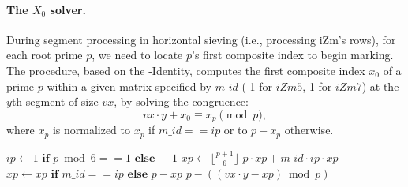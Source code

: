 \documentclass{article}
\begin{document}
\paragraph{The $X_0$ solver.}
During segment processing in horizontal sieving (i.e., processing iZm's rows), for each root prime $p$, we need to locate $p$'s first composite index to begin marking.
The  procedure, based on the \Xp-Identity, computes the first composite index $x_0$ of a prime $p$ within a given matrix specified by $m\_id$ (-1 for $iZm5$, 1 for $iZm7$) at the $y$th segment of size $vx$, by solving the congruence:
\[
vx\cdot y + x_0 \equiv x_p \pmod p,
\]
where $x_p$ is normalized to $x_p$ if $m\_id == ip$ or to $p - x_p$ otherwise.

\begin{algorithmic}[1]
        \State $ip \gets 1 \textbf{ if } p \bmod 6 == 1 \textbf{ else } -1$
        \State $xp \gets \lfloor\frac{p + 1}{6}\rfloor$
            \State \Return $p \cdot xp + m\_id \cdot ip \cdot xp$  
        \EndIf
        \State $xp \gets xp \textbf{ if } m\_id == ip \textbf{ else } p - xp$ 
        \State \Return $p - ((vx \cdot y - xp) \bmod p)$ 
    \EndProcedure
\end{algorithmic}
\end{document}
